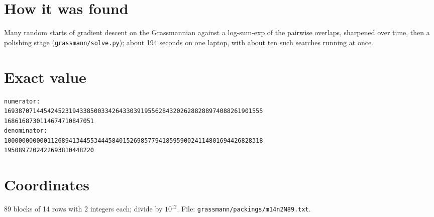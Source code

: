 \documentclass[11pt,a4paper]{article}
\begin{document}
\section{How it was found}
Many random starts of gradient descent on the Grassmannian against a log-sum-exp of the pairwise overlaps, sharpened over time, then a polishing stage (\texttt{grassmann/solve.py}); about 194 seconds on one laptop, with about ten such searches running at once.


\appendix
\section{Exact value}
{\small
\begin{verbatim}
numerator:
169387071445424523194338500334264330391955628432026288288974088261901555
1686168730114674710847051
denominator:
100000000000112689413445534445840152698577941859590024114801694426828318
1950897202422693810448220
\end{verbatim}}

\section{Coordinates}
89 blocks of 14 rows with 2 integers each; divide by $10^{12}$. File: \texttt{grassmann/packings/m14n2N89.txt}.
{\tiny
\begin{multicols}{4}
\end{multicols}}
\end{document}
